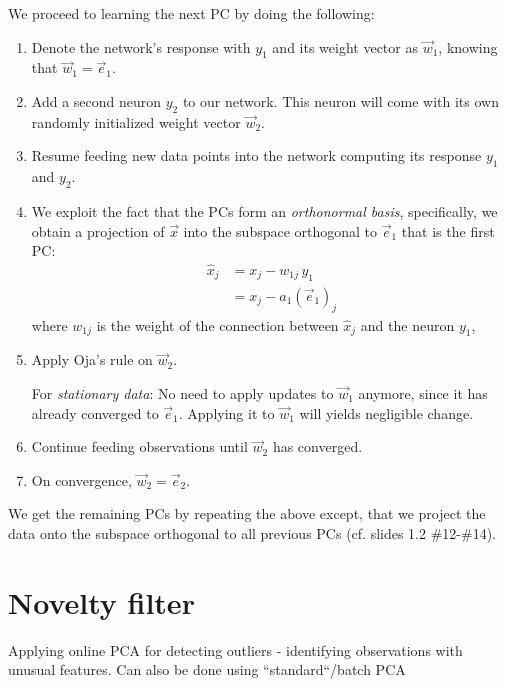\begin{frame}{\secname}

We proceed to learning the next PC by doing the following:
\begin{enumerate}
\item Denote the network's response with $y_1$ and its weight vector as $\vec w_1$, knowing that $\vec w_1 = \vec e_1$.
\item Add a second neuron $y_2$ to our network. This neuron will come with its own randomly initialized weight vector $\vec w_2$.
\item Resume feeding new data points into the network computing its response $y_1$ and $y_2$.
\item We exploit the fact that the PCs form an \emph{orthonormal basis}, specifically, we obtain a projection of $\vec x$ 
into the subspace orthogonal to $\vec e_1$ that is the first PC:
\begin{align}
\hat x_j &= x_j - w_{1j} \, y_1 \\
         &= x_j - a_1 (\vec e_1)_j
\end{align}
where $w_{1j}$ is the weight of the connection between $\hat x_j$ and the neuron $y_1$,
\item Apply Oja's rule on $\vec w_2$.

For \emph{stationary data}: No need to apply updates to $\vec w_1$ anymore, since it has already converged to $\vec e_1$. Applying it to $\vec w_1$ will yields negligible change.
 
\item Continue feeding observations until $\vec w_2$ has converged.
\item On convergence, $\vec w_2 = \vec e_2$.
\end{enumerate}

We get the remaining PCs by repeating the above except, that we project 
the data onto the subspace orthogonal to all previous PCs (cf. slides 1.2 \#12-\#14).

\end{frame}

\newpage

\section{Novelty filter}

Applying online PCA for detecting outliers - identifying observations with unusual features. 
Can also be done using ``standard``/batch PCA


